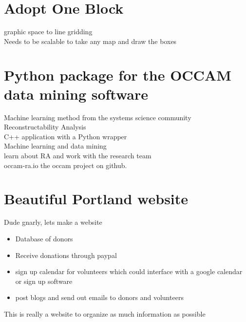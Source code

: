 \section*{Adopt One Block}
\noindent graphic space to line gridding\\
Needs to be scalable to take any map and draw the boxes\\

\section*{Python package for the OCCAM data mining software}
\noindent Machine learning method from the systems science community\\
Reconstructability Analysis\\
C++ application with a Python wrapper\\
Machine learning and data mining\\
learn about RA and work with the research team\\
occam-ra.io the occam project on github.\\

\section*{Beautiful Portland website}
\noindent Dude gnarly, lets make a website\\
\begin{itemize}
  \itemsep-1.5em
  \item Database of donors\\
  \item Receive donations through paypal\\
  \item sign up calendar for volunteers which could interface with a google calendar or sign up software\\
  \item post blogs and send out emails to donors and volunteers\\
\end{itemize}
This is really a website to organize as much information as possible\\
